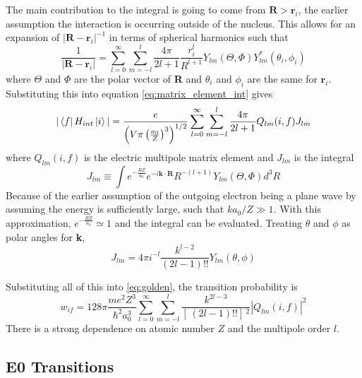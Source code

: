 The main contribution to the integral is going to come from $\textbf{R}>\textbf{r}_i$, the earlier assumption the interaction is occurring outside of the nucleus. This allows for an expansion of $|\textbf{R}-\textbf{r}_i|^{-1}$ in terms of spherical harmonics such that
\begin{equation}
\label{eq:expansion_Rri}
    \frac{1}{|\textbf{R}-\textbf{r}_i|} = \sum_{l=0}^\infty\sum_{m=-l}^{l}\frac{4\pi}{2l+1}\frac{r_i^l}{R^{l+1}}Y_{lm}(\Theta,\Phi)Y_{lm}^{*}(\theta_i,\phi_i)
\end{equation}
where $\Theta$ and $\Phi$ are the polar vector of \textbf{R} and $\theta_i$ and $\phi_i$ are the same for $\textbf{r}_i$. Substituting this into equation \ref{eq:matrix_element_int} gives
\begin{equation}
    |\bra{f}H_{int}\ket{i}| = \frac{e}{ \left(V\pi\left(\frac{a_0}{Z}\right)^3\right)^{1/2}} \sum_{l=0}^\infty\sum_{m=-l}^{l}\frac{4\pi}{2l+1} Q_{lm}(i,f)J_{lm}
\end{equation}
where $Q_{lm}(i,f)$ is the electric multipole matrix element and $J_{lm}$ is the integral
\begin{equation}
    J_{lm}\equiv\int e^{-\frac{RZ}{a_0}}e^{-i\textbf{k}\cdot\textbf{R}}R^{-(l+1)}Y_{lm}(\Theta,\Phi)d^3R
\end{equation}
Because of the earlier assumption of the outgoing electron being a plane wave by assuming the energy is sufficiently large, such that $ka_0/Z\gg1$. With this approximation, $e^{-\frac{RZ}{a_0}}\simeq1$ and the integral can be evaluated. Treating $\theta$ and $\phi$ as polar angles for \textbf{k}, 
\begin{equation}
    J_{lm}=4\pi i^{-l}\frac{k^{l-2}}{(2l-1)!!}Y_{lm}(\theta,\phi)
\end{equation}

Substituting all of this into \ref{eq:golden}, the transition probability is
\begin{equation}
    w_{if}=128\pi\frac{me^2Z^3}{\hbar^2a_0^3} \sum_{l=0}^\infty\sum_{m=-l}^{l} \frac{k^{2l-3}}{\left[\,(2l-1)!!\right]\,^2}|Q_{lm}(i,f)|^2
\end{equation}
There is a strong dependence on atomic number $Z$ and the multipole order $l$. 

\subsection{E0 Transitions}
\label{sec:E0}


